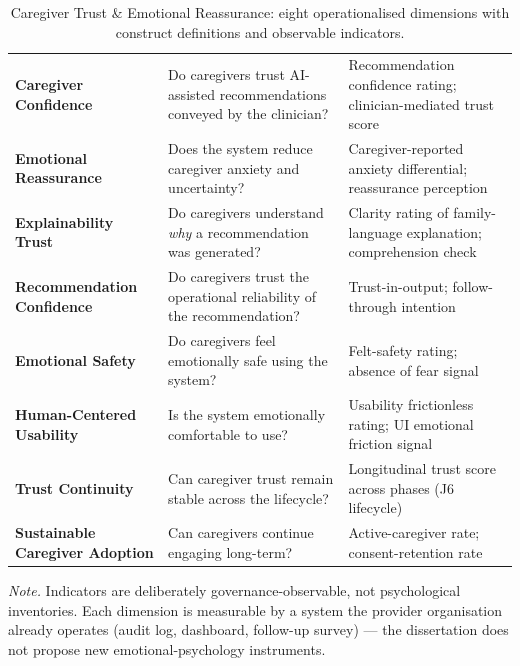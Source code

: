 {
\begin{xltabular}{\textwidth}{@{} >{\raggedright\arraybackslash}p{3.4cm} p{5.5cm} >{\raggedright\arraybackslash}p{5.4cm} @{}}
\caption[Caregiver Trust \& Emotional Reassurance --- Eight Dimensions]{Caregiver Trust \& Emotional Reassurance: eight operationalised dimensions with construct definitions and observable indicators.}\label{tab:appk_caregiver_trust_dims} \\
\toprule
{} &  &  \\
\midrule
\endfirsthead
\endhead
\bottomrule
\endlastfoot
\textbf{Caregiver Confidence}        & Do caregivers trust AI-assisted recommendations conveyed by the clinician? & Recommendation confidence rating; clinician-mediated trust score \\
\textbf{Emotional Reassurance}        & Does the system reduce caregiver anxiety and uncertainty?                   & Caregiver-reported anxiety differential; reassurance perception \\
\textbf{Explainability Trust}         & Do caregivers understand \emph{why} a recommendation was generated?         & Clarity rating of family-language explanation; comprehension check \\
\textbf{Recommendation Confidence}    & Do caregivers trust the operational reliability of the recommendation?     & Trust-in-output; follow-through intention \\
\textbf{Emotional Safety}             & Do caregivers feel emotionally safe using the system?                       & Felt-safety rating; absence of fear signal \\
\textbf{Human-Centered Usability}     & Is the system emotionally comfortable to use?                                & Usability frictionless rating; UI emotional friction signal \\
\textbf{Trust Continuity}             & Can caregiver trust remain stable across the lifecycle?                     & Longitudinal trust score across phases (J6 lifecycle) \\
\textbf{Sustainable Caregiver Adoption} & Can caregivers continue engaging long-term?                                  & Active-caregiver rate; consent-retention rate \\
\end{xltabular}}
\vspace{0.4em}
\noindent\textit{Note.} Indicators are deliberately governance-observable, not psychological inventories. Each dimension is measurable by a system the provider organisation already operates (audit log, dashboard, follow-up survey) --- the dissertation does not propose new emotional-psychology instruments.

